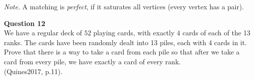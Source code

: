 \documentclass[jou]{apa6}
\begin{document}
{\em Note.} A matching is {\em perfect}, if it saturates all vertices
(every vertex has a pair).

\vspace{10pt}
{\bf Question 12}\\
We have a regular deck of $52$ playing cards, with exactly $4$ cards of each of the
13 ranks. The cards have been randomly dealt into 13 piles, each with 4 cards in
it. Prove that there is a way to take a card from each pile so that after we take
a card from every pile, we have exactly a card of every rank.\\
(Quines2017, p.11).
\end{document}
